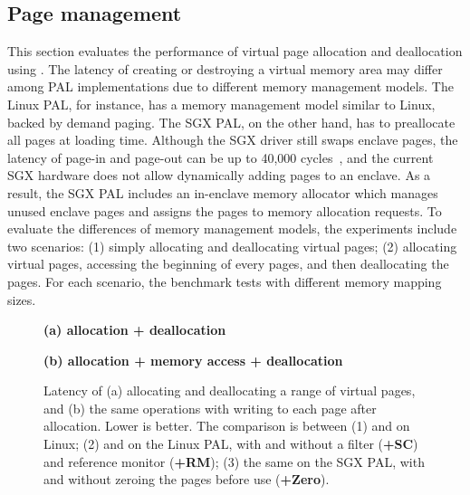 \subsection{Page management}
\label{sec:eval:pal:memory}


This section evaluates the performance of virtual page allocation and deallocation
using \thehostabi{}.
The latency of creating or destroying a virtual memory area
may differ among PAL implementations
due to different memory management models.
The Linux PAL, for instance, has a memory management model
similar to Linux,
backed by demand paging.
The SGX PAL, on the other hand, has to preallocate all pages at loading time.
Although the SGX driver still swaps enclave pages,
the latency of page-in and page-out can be up to 40,000 cycles~\cite{orenbach17eleos},
and the current SGX hardware does not allow dynamically adding pages
to an enclave.
As a result, the SGX PAL includes an in-enclave memory allocator
which manages unused enclave pages
and assigns the pages to memory allocation requests.
To evaluate
the differences of memory management models,
the experiments
include two scenarios:
(1) simply allocating and deallocating virtual pages;
(2) allocating virtual pages,
accessing the beginning of every pages,
and then deallocating the pages.
For each scenario,
the benchmark tests with different memory mapping sizes.





\begin{figure*}[t!]
\centering
\footnotesize
{}
\parbox{0.49\textwidth}{\centering\bf (a) allocation + deallocation}
\parbox{0.49\textwidth}{\centering\bf (b) allocation + memory access + deallocation}
\caption{Latency of (a) allocating and deallocating a range of virtual pages, and (b) the same operations with writing to each page after allocation. Lower is better.
The comparison is between (1)  and  on Linux; (2)  and  on the Linux PAL, with and without a \seccomp{} filter ({\bf +SC}) and reference monitor ({\bf +RM}); (3) the same \hostapis{} on the SGX PAL, with and without zeroing the pages before use ({\bf +Zero}).}
\label{fig:eval:pal:mmap-latency}
\end{figure*}


